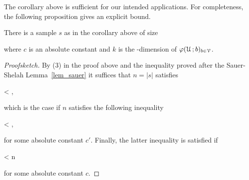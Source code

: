 \documentclass[scombinatorics.tex]{subfiles}
\begin{document}
The corollary above is sufficient for our intended applications.
For completeness, the following proposition gives an explicit bound.

\begin{proposition}
  There is a sample $s$ as in the corollary above of size
  
  {}
  {}
  
  where $c$ is an absolute constant and $k$ is the \vc-dimension of $\varphi(\EuScript U\,;b)_{b\in\EuScript V}$.
\end{proposition}

\begin{proof}[Proofsketch]
  By (3) in the proof above and the inequality proved after the Sauer-Shelah Lemma~\ref{lem_sauer} it suffices that $n=|s|$ satisfies
  
  {<}
  {,}
  
  which is the case if $n$ satisfies the following inequality 

  {<}
  {,}

  for some absolute constant $c'$.
  Finally, the latter inequality is satisfied if 

  {<}
  {n}

  for some absolute constant $c$.
\end{proof}






\end{document}
